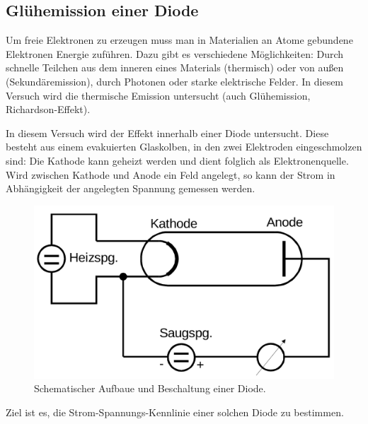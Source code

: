 \subsection{Glühemission einer Diode}
\label{sub:glühemission_einer_diode}
  Um freie Elektronen zu erzeugen muss man in Materialien an Atome gebundene Elektronen Energie zuführen. Dazu gibt es verschiedene Möglichkeiten:
  Durch schnelle Teilchen aus dem inneren eines Materials (thermisch) oder von außen (Sekundäremission), durch Photonen oder starke elektrische Felder.
  In diesem Versuch wird die thermische Emission untersucht (auch Glühemission, Richardson-Effekt).
  \par
  In diesem Versuch wird der Effekt innerhalb einer Diode untersucht. Diese besteht aus einem evakuierten Glaskolben, in den zwei Elektroden eingeschmolzen sind: Die Kathode kann geheizt werden und dient folglich als Elektronenquelle. Wird zwischen Kathode und Anode ein Feld angelegt, so kann der Strom in Abhängigkeit der angelegten Spannung gemessen werden.

  \begin{figure}[H]
    \centering
    \includegraphics[width=\textwidth]{../figures/diode_aufbau.png}
    \caption{Schematischer Aufbaue und Beschaltung einer Diode.}
    \label{fig:_figures_diode_aufbau_png}
  \end{figure}

  Ziel ist es, die Strom-Spannungs-Kennlinie einer solchen Diode zu bestimmen.


